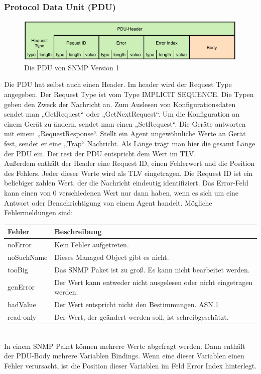 \documentclass[11pt,a4paper]{article}
\begin{document}
\subsubsection{Protocol Data Unit (PDU)}
\begin{figure}[h]
	\centering
	\includegraphics[scale=.8]{Bilder/SNMPv1-PDU.png}
	\caption{Die PDU von SNMP Version 1}
\end{figure}
Die PDU hat selbst auch einen Header. Im header wird der Request Type angegeben. Der Request Type ist vom Type IMPLICIT SEQUENCE. Die Typen geben den Zweck der Nachricht an. Zum Auslesen von Konfigurationsdaten sendet man „GetRequest“ oder „GetNextRequest“. Um die Konfiguration an einem Gerät zu ändern, sendet man einen „SetRequest“. Die Geräte antworten mit einem „RequestResponse“. Stellt ein Agent ungewöhnliche Werte an Gerät fest, sendet er eine „Trap“ Nachricht. Als Länge trägt man hier die gesamt Länge der PDU ein. Der rest der PDU entspricht dem Wert im TLV.\\
Außerdem enthält der Header eine Request ID, einen Fehlerwert und die Position des Fehlers. Jeder dieser Werte wird als TLV eingetragen.
Die Request ID ist ein beliebiger zahlen Wert, der die Nachricht eindeutig identifiziert.
Das Error-Feld kann einen von 0 verschiedenen Wert nur dann haben, wenn es sich um eine Antwort oder Benachrichtigung von einem Agent handelt. Mögliche Fehlermeldungen sind:\\
\emptyline
\begin{tabular}{| l | l |}
	\hline
	\rowcolor{lgray}
	Fehler				& Beschreibung\\
	\hline
	noError				& Kein Fehler aufgetreten.\\
	\hline
	noSuchName	&	Dieses Managed Object gibt es nicht.\\
	\hline
	tooBig				&	Das SNMP Paket ist zu groß. Es kann nicht bearbeitet werden.\\
	\hline
	genError			&	Der Wert kann entweder  nicht ausgelesen oder nicht eingetragen werden.\\
	\hline
	badValue			&	Der Wert entspricht nicht den Bestimmungen. ASN.1\\
	\hline
	read-only			&	Der Wert, der geändert werden soll, ist schreibgeschützt.\\
	\hline
\end{tabular}
\\
\emptyline
In einem SNMP Paket können mehrere Werte abgefragt werden. Dann enthält der PDU-Body mehrere Variablen Bindings. Wenn eine dieser Variablen einen Fehler verursacht, ist die Position dieser Variablen im Feld Error Index hinterlegt.\\
\end{document}
